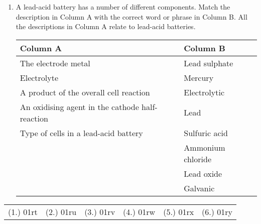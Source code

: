 \begin{eocexercises}{}
\begin{enumerate}
{\begin{enumerate}
\item{Name the process at (1).}
\item{Name the gas at (2).}
\item{Name the process at (3) that produces gas (2).}
\item{Name the product at (4).}
\item{Name two fertilisers that can be produced from nitric acid.}
\end{enumerate}
}

\item{
A lead-acid battery has a number of different components. Match the description in Column A with the correct word or phrase in Column B. All the descriptions in Column A relate to lead-acid batteries.

\begin{center}
\begin{tabular}{ll}
\textbf{Column A} & \textbf{Column B} \\ \hline
The electrode metal \ \ \ \ \ \ \ & Lead sulphate \\
Electrolyte & Mercury \\
A product of the overall cell reaction & Electrolytic \\
An oxidising agent in the cathode half-reaction & Lead \\
Type of cells in a lead-acid battery & Sulfuric acid \\
 & Ammonium chloride \\
 & Lead oxide \\
 & Galvanic \\
\end{tabular}

\end{center}

}
\end{enumerate}
\par \practiceinfo
\par \begin{tabular}[h]{cccccc}
(1.)	01rt	&
(2.)	01ru	&
(3.)	01rv	&
(4.)	01rw	&
(5.)	01rx	&
(6.)	01ry	\\ %
\end{tabular}
\end{eocexercises}

